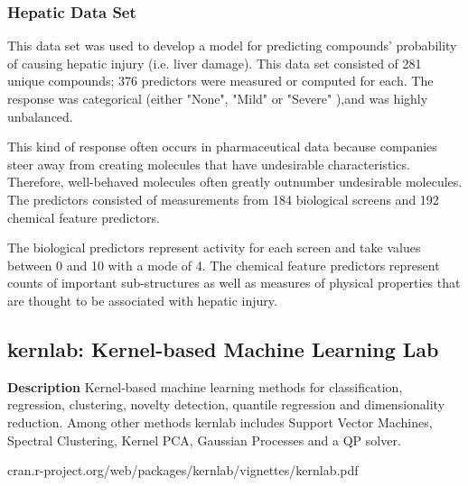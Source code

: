 \documentclass[caret-main.tex]{subfiles}
\begin{document}
\subsubsection{Hepatic Data Set}
This data set was used to develop a model for predicting compounds’ probability of causing hepatic
injury (i.e. liver damage). This data set consisted of 281 unique compounds; 376 predictors were
measured or computed for each. The response was categorical (either "None", "Mild" or "Severe"
),and was highly unbalanced.

This kind of response often occurs in pharmaceutical data because companies steer away from
creating molecules that have undesirable characteristics. Therefore, well-behaved molecules often
greatly outnumber undesirable molecules. The predictors consisted of measurements from 184
biological screens and 192 chemical feature predictors. 

The biological predictors represent activity for each screen and take values between 0 and 10 with a mode of 4.  The chemical feature predictors represent counts of important sub-structures as well as measures of physical properties that are thought to be 
associated 
with hepatic injury.
\subsection{kernlab: Kernel-based Machine Learning Lab}


\textbf{Description} Kernel-based machine learning methods for classification, regression, clustering, novelty detection, quantile regression and dimensionality reduction. Among other methods kernlab includes Support Vector Machines, Spectral Clustering, Kernel PCA, Gaussian Processes and a QP solver.

cran.r-project.org/web/packages/kernlab/vignettes/kernlab.pdf
\end{document}
